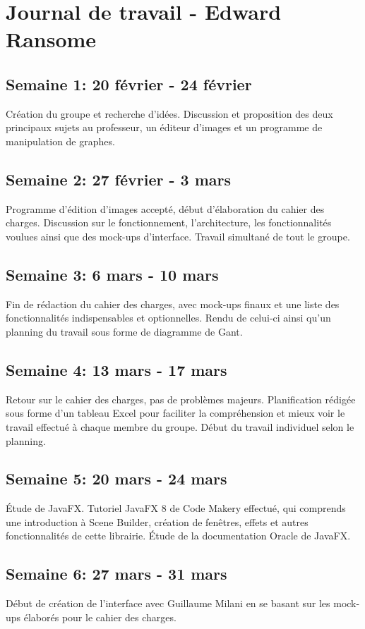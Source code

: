 \section{Journal de travail - Edward Ransome}

\subsection{Semaine 1: 20 février - 24 février}
Création du groupe et recherche d'idées. Discussion et proposition des deux principaux sujets au professeur, un éditeur d'images et un programme de manipulation de graphes.
\subsection{Semaine 2: 27 février - 3 mars}
Programme d'édition d'images accepté, début d'élaboration du cahier des charges. Discussion sur le fonctionnement, l'architecture, les fonctionnalités voulues ainsi que des mock-ups d'interface. Travail simultané de tout le groupe.
\subsection{Semaine 3: 6 mars - 10 mars}
Fin de rédaction du cahier des charges, avec mock-ups finaux et une liste des fonctionnalités indispensables et optionnelles. Rendu de celui-ci ainsi qu'un planning du travail sous forme de diagramme de Gant.
\subsection{Semaine 4: 13 mars - 17 mars}
Retour sur le cahier des charges, pas de problèmes majeurs. Planification rédigée sous forme d'un tableau Excel pour faciliter la compréhension et mieux voir le travail effectué à chaque membre du groupe. Début du travail individuel selon le planning. 
\subsection{Semaine 5: 20 mars - 24 mars}
Étude de JavaFX. Tutoriel JavaFX 8 de Code Makery effectué, qui comprends une introduction à Scene Builder, création de fenêtres, effets et autres fonctionnalités de cette librairie. Étude de la documentation Oracle de JavaFX.
\subsection{Semaine 6: 27 mars - 31 mars}
Début de création de l'interface avec Guillaume Milani en se basant sur les mock-ups élaborés pour le cahier des charges.
